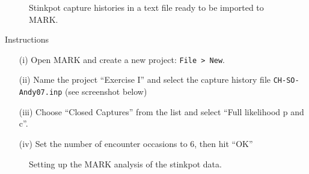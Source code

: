 \documentclass[12pt]{article}
\begin{document}
\begin{figure}[h!]
  \centering
  \caption{\small Stinkpot capture histories in a text file ready to
    be imported to MARK.} 
  \label{fig:stink07-data}
\end{figure}

Instructions
\begin{enumerate}
  \item[(i)] Open MARK and create a new project: \verb+File > New+.
  \item[(ii)] Name the project ``Exercise I'' and select the capture
    history file \texttt{CH-SO-Andy07.inp} (see screenshot below)
  \item[(iii)] Choose ``Closed Captures'' from the list and select
    ``Full likelihood p and c''.
  \item[(iv)] Set the number of encounter occasions to 6, then hit
    ``OK'' 
\end{enumerate}

\begin{figure}[h!]
  \centering
  \caption{\small Setting up the MARK analysis of the stinkpot data.} 
  \label{fig:stink07-mark}
\end{figure}
\end{document}
